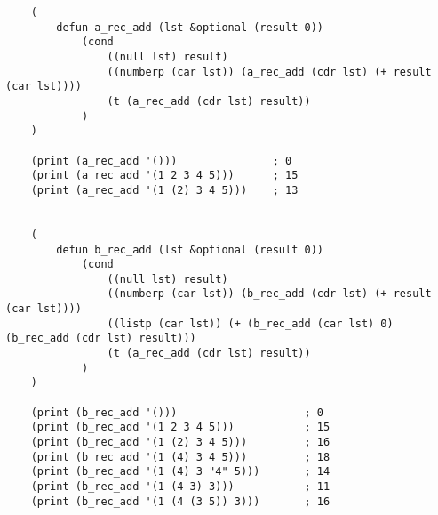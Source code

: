 \begin{lstlisting}
    (
        defun a_rec_add (lst &optional (result 0))
            (cond
                ((null lst) result)
                ((numberp (car lst)) (a_rec_add (cdr lst) (+ result (car lst))))
                (t (a_rec_add (cdr lst) result))
            )
    )
    
    (print (a_rec_add '()))               ; 0
    (print (a_rec_add '(1 2 3 4 5)))      ; 15
    (print (a_rec_add '(1 (2) 3 4 5)))    ; 13
    
    
    (
        defun b_rec_add (lst &optional (result 0))
            (cond
                ((null lst) result)
                ((numberp (car lst)) (b_rec_add (cdr lst) (+ result (car lst))))
                ((listp (car lst)) (+ (b_rec_add (car lst) 0) (b_rec_add (cdr lst) result)))
                (t (a_rec_add (cdr lst) result))
            )
    )
    
    (print (b_rec_add '()))                    ; 0
    (print (b_rec_add '(1 2 3 4 5)))           ; 15
    (print (b_rec_add '(1 (2) 3 4 5)))         ; 16
    (print (b_rec_add '(1 (4) 3 4 5)))         ; 18
    (print (b_rec_add '(1 (4) 3 "4" 5)))       ; 14
    (print (b_rec_add '(1 (4 3) 3)))           ; 11
    (print (b_rec_add '(1 (4 (3 5)) 3)))       ; 16
\end{lstlisting}